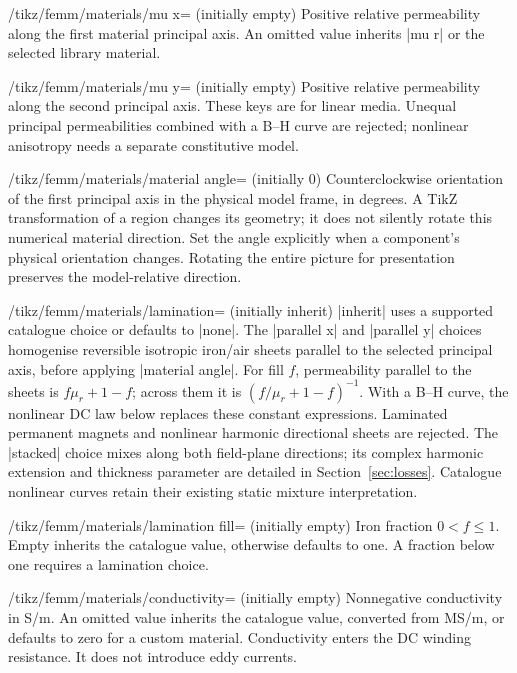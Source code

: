 \begin{key}{/tikz/femm/materials/mu x= (initially empty)}
Positive relative permeability along the first material principal axis.
An omitted value inherits |mu r| or the selected library material.
\end{key}
\begin{key}{/tikz/femm/materials/mu y= (initially empty)}
Positive relative permeability along the second principal axis. These keys are
for linear media. Unequal principal permeabilities combined with a B--H curve
are rejected; nonlinear anisotropy needs a separate constitutive model.
\end{key}
\begin{key}{/tikz/femm/materials/material angle= (initially 0)}
Counterclockwise orientation of the first principal axis in the physical model
frame, in degrees. A TikZ transformation of a region changes its geometry; it
does not silently rotate this numerical material direction. Set the angle
explicitly when a component's physical orientation changes. Rotating the entire
picture for presentation preserves the model-relative direction.
\end{key}
\begin{key}{/tikz/femm/materials/lamination= (initially inherit)}
|inherit| uses a supported catalogue choice or defaults to |none|. The
|parallel x| and |parallel y| choices homogenise reversible isotropic iron/air
sheets parallel to the selected principal axis, before applying |material angle|.
For fill $f$, permeability parallel to the sheets is $f\mu_r+1-f$; across them
it is $(f/\mu_r+1-f)^{-1}$. With a B--H curve, the nonlinear DC law
below replaces these constant expressions. Laminated permanent magnets and
nonlinear harmonic directional sheets are rejected. The |stacked| choice mixes along both field-plane directions; its complex
harmonic extension and thickness parameter are detailed in Section~\ref{sec:losses}.
Catalogue nonlinear curves retain their existing static mixture interpretation.
\end{key}
\begin{key}{/tikz/femm/materials/lamination fill= (initially empty)}
Iron fraction $0<f\leq1$. Empty inherits the catalogue value, otherwise defaults
to one. A fraction below one requires a lamination choice.
\end{key}
\begin{key}{/tikz/femm/materials/conductivity= (initially empty)}
Nonnegative conductivity in S/m. An omitted value inherits the catalogue value,
converted from MS/m, or defaults to zero for a custom material. Conductivity
enters the DC winding resistance. It does not introduce eddy currents.
\end{key}

